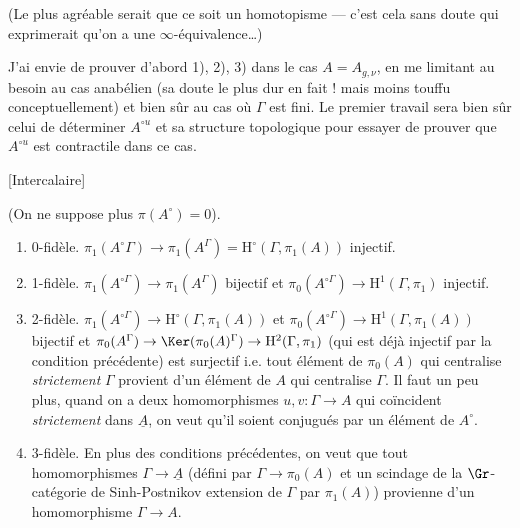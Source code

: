 (Le plus agréable serait que ce soit un homotopisme --- c'est cela sans doute qui exprimerait qu'on a une $\infty$-équivalence\dots)

J'ai envie de prouver d'abord 1), 2), 3) dans le cas $A = A_{g, \nu}$, en me limitant au besoin au cas anabélien (sa doute le plus dur en fait ! mais moins touffu conceptuellement) et bien sûr au cas où $\Gamma$ est fini. Le premier travail sera bien sûr celui de déterminer $A^{\circ u}$ et sa structure topologique pour essayer de prouver que $A^{\circ u}$ est contractile dans ce cas.

\newpage

[Intercalaire]

\vskip 2cm

(On ne suppose plus $\pi(A^\circ) =0$).

\begin{enumerate}
    \item[1)] 0-fidèle. $\pi_1 (A^\circ \Gamma) \to \pi_1(A^\Gamma) = \mathrm{H}^\circ(\Gamma, \pi_1(A))$ injectif. 
    \item[2)] 1-fidèle. $\pi_1 (A^{\circ \Gamma}) \to \pi_1(A^\Gamma)$ bijectif et $\pi_0(A^{\circ \Gamma}) \to \mathrm{H}^1(\Gamma, \pi_1)$ injectif.
    \item[3)] 2-fidèle. $\pi_1(A^{\circ \Gamma}) \to \mathrm{H}^\circ (\Gamma, \pi_1(A))$ et $\pi_0 (A^{\circ \Gamma}) \to \mathrm{H}^1(\Gamma, \pi_1(A))$ bijectif et $\pi_0 (A^\Gamma) \to \Ker (\pi_0(A)^\Gamma) \to \mathrm{H}^2(\Gamma, \pi_1)$ (qui est déjà injectif par la condition précédente) est surjectif i.e. tout élément de $\pi_0(A)$ qui centralise \emph{strictement} $\Gamma$ provient d'un élément de $A$ qui centralise $\Gamma$. Il faut un peu plus, quand on a deux homomorphismes $u, v: \Gamma \to A$ qui coïncident \emph{strictement} dans $\underline{A}$, on veut qu'il soient conjugués par un élément de $A^\circ$. 
    \item[4)] 3-fidèle. En plus des conditions précédentes, on veut que tout homomorphismes $\Gamma \to \underline{A}$ (défini par $\Gamma \to \pi_0 (A)$ et un scindage de la $\Gr$-catégorie de Sinh-Postnikov extension de $\Gamma$ par $\pi_1(A)$) provienne d'un homomorphisme $\Gamma \to A$.
\end{enumerate}


